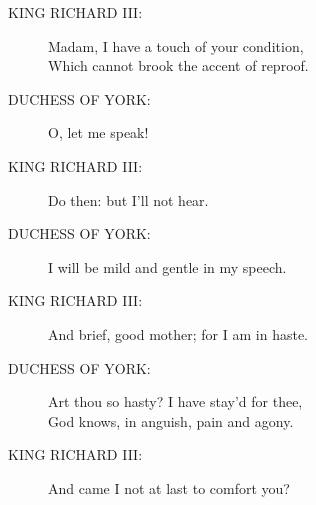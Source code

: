 \documentclass{article}
\begin{document}
\begin{description}
\item[KING RICHARD III:] 
\hspace{1pt}Madam, I have a touch of your condition,\\
\hspace{1pt}Which cannot brook the accent of reproof.\\
\end{description}
\begin{description}
\item[DUCHESS OF YORK:] 
\hspace{1pt}O, let me speak!\\
\end{description}
\begin{description}
\item[KING RICHARD III:] 
\hspace{1pt}Do then: but I'll not hear.\\
\end{description}
\begin{description}
\item[DUCHESS OF YORK:] 
\hspace{1pt}I will be mild and gentle in my speech.\\
\end{description}
\begin{description}
\item[KING RICHARD III:] 
\hspace{1pt}And brief, good mother; for I am in haste.\\
\end{description}
\begin{description}
\item[DUCHESS OF YORK:] 
\hspace{1pt}Art thou so hasty? I have stay'd for thee,\\
\hspace{1pt}God knows, in anguish, pain and agony.\\
\end{description}
\begin{description}
\item[KING RICHARD III:] 
\hspace{1pt}And came I not at last to comfort you?\\
\end{description}
\end{document}
